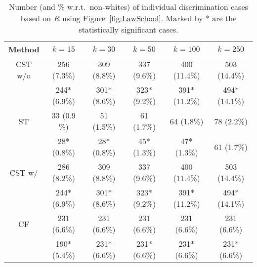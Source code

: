 %
\begin{table}[t]
\caption{Number (and \% w.r.t.~non-whites) of individual discrimination cases based on $R$ using Figure~\ref{fig:LawSchool}. Marked by * are the statistically significant cases.}
  \label{table:k-results_RACE}
  \centering
  \begin{tabular}{cccccc}
    \toprule
    Method & $k=15$ & $k=30$ & $k=50$ & $k=100$ & $k=250$\\
    \midrule
    CST w/o & 256 (7.3\%) & 309 (8.8\%) & 337 (9.6\%) & 400 (11.4\%)  & 503 (14.4\%) \\
     & 244* (6.9\%) & 301* (8.6\%) & 323* (9.2\%) & 391* (11.2\%)  & 494* (14.1\%) \\
     \midrule
    ST & 33 (0.9 \%) & 51 (1.5\%) & 61 (1.7\%) & 64 (1.8\%) & 78 (2.2\%) \\
    & 28* (0.8\%) & 28* (0.8\%) & 45* (1.3\%) & 47* (1.3\%) & 61 (1.7\%) \\
    \midrule
    CST w/ & 286 (8.2\%) & 309 (8.8\%) & 337 (9.6\%) & 400 (11.4\%)  & 503 (14.4\%)\\
    & 244* (6.9\%) & 301* (8.6\%) & 323* (9.2\%) & 391* (11.2\%)  & 494* (14.1\%) \\
    \midrule
    CF & 231 (6.6\%) & 231 (6.6\%) & 231 (6.6\%) &  231 (6.6\%) &  231 (6.6\%) \\
    & 190* (5.4\%) & 231* (6.6\%) & 231* (6.6\%) & 231* (6.6\%) & 231* (6.6\%) \\
    \bottomrule
  \end{tabular}
\end{table}
%

